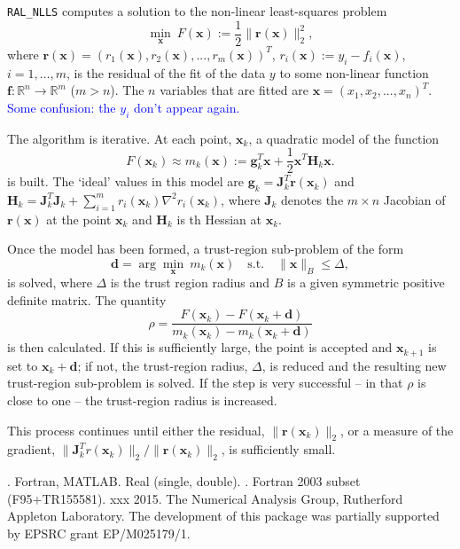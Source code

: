 \documentclass{hslspec}
\newcommand{\libraryname}{RAL}
\newcommand{\packagename}{NLLS}
\newcommand{\fullpackagename}{\libraryname\_\packagename}
\newcommand{\versionum}{1.0.0}
\newcommand{\versiondate}{xx xx 20xx}
\begin{document}
\hslheader

\hslsummary
{\tt \fullpackagename} computes a solution to the non-linear least-squares problem
\begin{equation}
\min_{\bm x} \  F({\bm x}) := \frac{1}{2}\| {\bm r}({\bm x}) \|_2^2,
\label{eq:nlls_problem}
\end{equation}
where ${\bm r}({\bm x }) =(r_1({\bm x }), r_2({\bm x }),...,r_m({\bm x }))^T$, 
$r_i({\bm x }) := y_i - f_i({\bm x })$, $i = 1,\dots,m$, is the residual of 
the fit of the data $y$ to some non-linear function ${\bm f} : \mathbb{R}^n \rightarrow \mathbb{R}^m$
($m>n$).  
The $n$ variables that are fitted are ${\bm x }=(x_1,x_2,...,x_n)^T$.
\textcolor{blue}{Some confusion: the $y_i$ don't appear again.}

The algorithm is iterative.
At each point, ${\bm x }_k$, a quadratic model of the function
\[
F({\bm x }_k) \approx m_k({\bm x }) := {\bm g}_k^T {\bm x } + \frac{1}{2} {\bm x }^T {\bm H}_k {\bm x }.
\]
is built.
The `ideal' values in this model are ${\bm g}_k = {\bm J}_k^T{\bm r}({\bm x }_k)$ and 
${\bm H}_k = {\bm J}_k^T{\bm J}_k + \sum_{i = 1}^m r_i({\bm x}_k) \nabla^2 r_i({\bm x}_k)$, 
where ${\bm J}_k$ denotes the $m \times n$ Jacobian of ${\bm r}({\bm x })$ at the point ${\bm x }_k$
and ${\bm H}_k$ is th Hessian at ${\bm x }_k$.

Once the model has been formed, a trust-region sub-problem of the form
\[
{\bm d} = \arg \min_{{\bm x }} \ m_k({\bm x }) \quad \mathrm{s.t.} \quad  \|{\bm x }\|_B \leq \Delta,
\]
is solved, 
where $\Delta$ is the trust region radius and $B$ is a given symmetric positive definite matrix. 
The quantity
\[\rho = \frac{F({\bm x }_k) - F({\bm x }_k + {\bm d})}{m_k({\bm x }_k) - m_k({\bm x }_k + {\bm d})}\]
is then calculated.
If this is sufficiently large, the point is accepted and  ${\bm x }_{k+1}$ is set to ${\bm x }_k + {\bm d}$; if not, the trust-region radius, $\Delta$, 
is reduced and  the resulting new trust-region sub-problem is solved.  If the step is very successful -- in that $\rho$ is close to one -- 
the trust-region radius is increased.

This process continues until either the residual, $\|{\bm r}({\bm x }_k)\|_2$, or a measure of the gradient,
$\|{\bm J}_k^Tr({\bm x }_k)\|_2 / \|{\bm r}({\bm x }_k)\|_2$, is sufficiently small.


\hslattributes
\hslversions{\versionum\ ({\color{red}\versiondate)}}.
\hslinterfaces Fortran, MATLAB.
\hslIRDCZ Real (single, double).
.
\hsllanguage Fortran 2003 subset (F95+TR155581).  
\hsldate xxx 2015. 
\hslorigin The Numerical Analysis Group, Rutherford Appleton Laboratory.
\hslremark The development of this package was 
partially supported by EPSRC grant EP/M025179/1.
\end{document}
